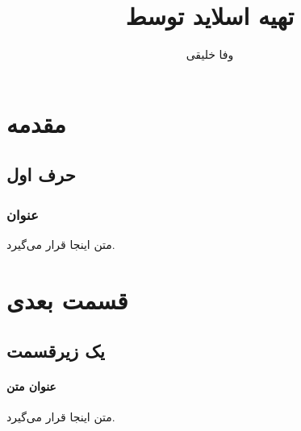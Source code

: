 \documentclass{beamer}
\title{تهیه اسلاید توسط \eng{\XePersian}}
\author{وفا خلیقی}
\institute{نام دانشگاه}
\begin{document}
\maths
\begin{farsi}
\begin{frame}
	\titlepage
\end{frame}
\section{مقدمه}
\subsection{حرف اول}
\begin{frame}
\frametitle{عنوان}
متن اینجا قرار می‌گیرد.
\end{frame}
\section{قسمت بعدی}
\subsection{یک زیرقسمت}
\begin{frame}
\framesubtitle{عنوان متن}
متن اینجا قرار می‌گیرد.
\end{frame}
\end{farsi}
\end{document}
